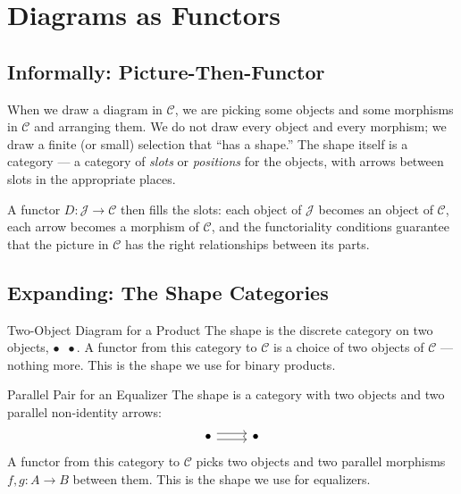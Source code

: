 \section{Diagrams as Functors}
\label{sec:diagrams-as-functors}

\subsection{Informally: Picture-Then-Functor}

When we draw a diagram in $\mathcal{C}$, we are picking some objects and
some morphisms in $\mathcal{C}$ and arranging them. We do not draw every
object and every morphism; we draw a finite (or small) selection that
``has a shape.'' The shape itself is a category --- a category of
\emph{slots} or \emph{positions} for the objects, with arrows between
slots in the appropriate places.

A functor $D : \mathcal{J} \to \mathcal{C}$ then fills the slots: each
object of $\mathcal{J}$ becomes an object of $\mathcal{C}$, each arrow
becomes a morphism of $\mathcal{C}$, and the functoriality conditions
guarantee that the picture in $\mathcal{C}$ has the right relationships
between its parts.

\subsection{Expanding: The Shape Categories}

\begin{example}{Two-Object Diagram for a Product}
The shape is the discrete category on two objects, $\bullet \;\; \bullet$.
A functor from this category to $\mathcal{C}$ is a choice of two objects
of $\mathcal{C}$ --- nothing more. This is the shape we use for binary
products.
\end{example}

\begin{example}{Parallel Pair for an Equalizer}
The shape is a category with two objects and two parallel non-identity
arrows:
\[
\begin{tikzcd}
  \bullet \arrow[r, shift left] \arrow[r, shift right] & \bullet
\end{tikzcd}
\]
A functor from this category to $\mathcal{C}$ picks two objects and two
parallel morphisms $f, g : A \to B$ between them. This is the shape we
use for equalizers.
\end{example}

